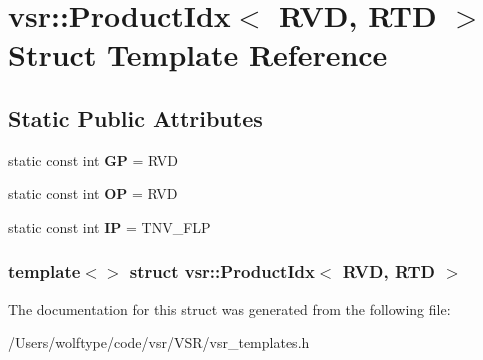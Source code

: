 \hypertarget{structvsr_1_1_product_idx_3_01_r_v_d_00_01_r_t_d_01_4}{\section{vsr\-:\-:Product\-Idx$<$ R\-V\-D, R\-T\-D $>$ Struct Template Reference}
\label{structvsr_1_1_product_idx_3_01_r_v_d_00_01_r_t_d_01_4}
}
\subsection*{Static Public Attributes}
\begin{DoxyCompactItemize}
\item 
\hypertarget{structvsr_1_1_product_idx_3_01_r_v_d_00_01_r_t_d_01_4_a50f79901650ea369f1f78f7ad7e41718}{static const int {\bfseries G\-P} = R\-V\-D}\label{structvsr_1_1_product_idx_3_01_r_v_d_00_01_r_t_d_01_4_a50f79901650ea369f1f78f7ad7e41718}

\item 
\hypertarget{structvsr_1_1_product_idx_3_01_r_v_d_00_01_r_t_d_01_4_a125fd6bab78ccd4a06e790ecfe414c36}{static const int {\bfseries O\-P} = R\-V\-D}\label{structvsr_1_1_product_idx_3_01_r_v_d_00_01_r_t_d_01_4_a125fd6bab78ccd4a06e790ecfe414c36}

\item 
\hypertarget{structvsr_1_1_product_idx_3_01_r_v_d_00_01_r_t_d_01_4_a00cc80f543a2819896d167a50495bed6}{static const int {\bfseries I\-P} = T\-N\-V\-\_\-\-F\-L\-P}\label{structvsr_1_1_product_idx_3_01_r_v_d_00_01_r_t_d_01_4_a00cc80f543a2819896d167a50495bed6}

\end{DoxyCompactItemize}
\subsubsection*{template$<$$>$ struct vsr\-::\-Product\-Idx$<$ R\-V\-D, R\-T\-D $>$}



The documentation for this struct was generated from the following file\-:\begin{DoxyCompactItemize}
\item 
/\-Users/wolftype/code/vsr/\-V\-S\-R/vsr\-\_\-templates.\-h\end{DoxyCompactItemize}
